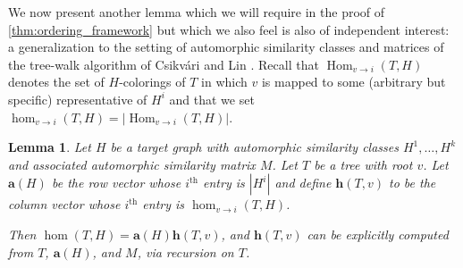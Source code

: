 \documentclass[11pt]{article}
\newtheorem{lemma}[theorem]{Lemma}
\theoremstyle{definition}
\newcommand{\ith}[1]{$#1^{\text{th}}$}
\newcommand{\Homclass}[4]{\Hom_{#1\to#2}(#3,#4)}
\newcommand{\homclass}[4]{\hom_{#1\to#2}(#3,#4)}
\DeclareMathOperator{\Hom}{Hom}
\begin{document}
We now present another lemma which we will require in the proof of \cref{thm:ordering_framework} but which we also feel is also of independent interest: a generalization to the setting of automorphic similarity classes and matrices of the tree-walk algorithm of Csikv\'ari and Lin \cite{CsikvariLin2014}. Recall that $\Homclass{v}{i}{T}{H}$ denotes the set of $H$-colorings of $T$ in which $v$ is mapped to some (arbitrary but specific) representative of $H^i$ and that we set $\homclass{v}{i}{T}{H}=|\Homclass{v}{i}{T}{H}|$.

\begin{lemma} \label{lem:tree_walk}
Let $H$ be a target graph with automorphic similarity classes $H^1, \ldots, H^k$ and associated automorphic similarity matrix $M$. Let $T$ be a tree with root $v$.  Let $\mathbf{a}(H)$ be the row vector whose \ith{i} entry is $|H^i|$ and define $\mathbf{h}(T,v)$ to be the column vector whose \ith{i} entry is $\homclass{v}{i}{T}{H}$.

Then $\hom(T,H)={\mathbf a}(H) \mathbf{h}(T,v)$, and $\mathbf{h}(T,v)$ can be explicitly computed from $T$, $\mathbf{a}(H)$, and $M$, via recursion on $T$.
\end{lemma}
\end{document}
